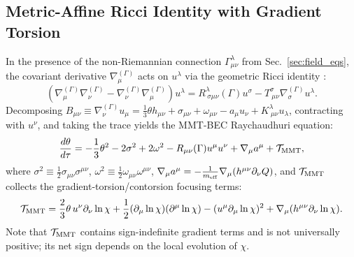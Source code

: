 \documentclass[preprint,12pt]{elsarticle}
\begin{document}
\subsection{Metric-Affine Ricci Identity with Gradient Torsion}
In the presence of the non-Riemannian connection $\Gamma^\lambda_{\mu\nu}$ from Sec.~\ref{sec:field_eqs}, the covariant derivative $\nabla^{(\Gamma)}_\mu$ acts on $u^\lambda$ via the geometric Ricci identity \cite{Hehl1976, KarSenGupta2007}:
\begin{equation}
    \left(\nabla^{(\Gamma)}_\mu \nabla^{(\Gamma)}_\nu - \nabla^{(\Gamma)}_\nu \nabla^{(\Gamma)}_\mu\right) u^\lambda = R^\lambda_{\ \sigma\mu\nu}(\Gamma) u^\sigma - T^\sigma_{\ \mu\nu} \nabla^{(\Gamma)}_\sigma u^\lambda.
    \label{eq:ricci_id}
\end{equation}
Decomposing $B_{\mu\nu} \equiv \nabla^{(\Gamma)}_\nu u_\mu = \frac{1}{3}\theta h_{\mu\nu} + \sigma_{\mu\nu} + \omega_{\mu\nu} - a_\mu u_\nu + K^\lambda_{\ \mu\nu}u_\lambda$, contracting with $u^\nu$, and taking the trace yields the MMT-BEC Raychaudhuri equation:
\begin{equation}
    \frac{d\theta}{d\tau} = -\frac{1}{3}\theta^2 - 2\sigma^2 + 2\omega^2 - R_{\mu\nu}(\Gamma)u^\mu u^\nu + \nabla_\mu a^\mu + \mathcal{T}_{\rm MMT},
    \label{eq:raychaudhuri_mmt}
\end{equation}
where $\sigma^2 \equiv \frac{1}{2}\sigma_{\mu\nu}\sigma^{\mu\nu}$, $\omega^2 \equiv \frac{1}{2}\omega_{\mu\nu}\omega^{\mu\nu}$, $\nabla_\mu a^\mu = -\frac{1}{m_{\rm eff}}\nabla_\mu(h^{\mu\nu}\partial_\nu Q)$, and $\mathcal{T}_{\rm MMT}$ collects the gradient-torsion/contorsion focusing terms:
\begin{equation}
    \mathcal{T}_{\rm MMT} = \frac{2}{3}\theta\, u^\nu \partial_\nu \ln\chi + \frac{1}{2}(\partial_\mu\ln\chi)(\partial^\mu\ln\chi) - (u^\mu\partial_\mu\ln\chi)^2 + \nabla_\mu(h^{\mu\nu}\partial_\nu\ln\chi).
    \label{eq:t_mmt}
\end{equation}
Note that $\mathcal{T}_{\rm MMT}$ contains sign-indefinite gradient terms and is not universally positive; its net sign depends on the local evolution of $\chi$.
\end{document}
